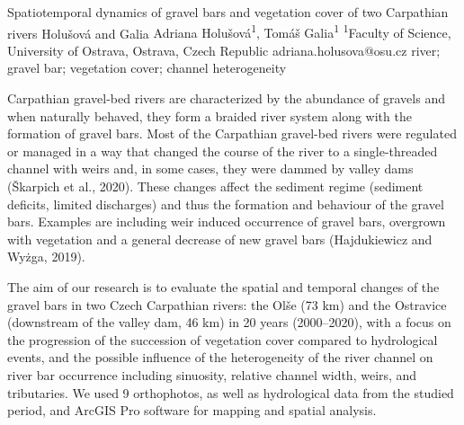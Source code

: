 \abstract
{Spatiotemporal dynamics of gravel bars and vegetation cover of two Carpathian rivers} 
{Holušová and Galia} 
{Adriana Holušová\textsuperscript{1}, Tomáš Galia\textsuperscript{1}} 
{\TLtag} 
{
\textsuperscript{1}Faculty of Science, University of Ostrava, Ostrava, Czech Republic
}
{adriana.holusova@osu.cz}  %
{river; gravel bar; vegetation cover; channel heterogeneity}
{Carpathian gravel-bed rivers are characterized by the abundance of gravels and when naturally behaved, they form a braided river system along with the formation of gravel bars. Most of the Carpathian gravel-bed rivers were regulated or managed in a way that changed the course of the river to a single-threaded channel with weirs and, in some cases, they were dammed by valley dams (Škarpich et al., 2020). These changes affect the sediment regime (sediment deficits, limited discharges) and thus the formation and behaviour of the gravel bars. Examples are including weir induced occurrence of gravel bars, overgrown with vegetation and a general decrease of new gravel bars (Hajdukiewicz and Wyżga, 2019).

The aim of our research is to evaluate the spatial and temporal changes of the gravel bars in two Czech Carpathian rivers: the Olše (73 km) and the Ostravice (downstream of the valley dam, 46 km) in 20 years (2000–2020), with a focus on the progression of the succession of vegetation cover compared to hydrological events, and the possible influence of the heterogeneity of the river channel on river bar occurrence including sinuosity, relative channel width, weirs, and tributaries. We used 9 orthophotos, as well as hydrological data from the studied period, and ArcGIS Pro software for mapping and spatial analysis. 

}
